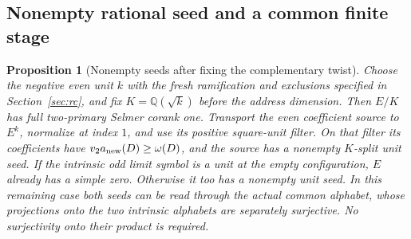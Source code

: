 \documentclass[11pt]{article}
\newtheorem{proposition}[theorem]{Proposition}
\theoremstyle{definition}
\theoremstyle{remark}
\newcommand{\Q}{\mathbb Q}
\begin{document}
\subsection{Nonempty rational seed and a common finite stage}
\begin{proposition}[Nonempty seeds after fixing the complementary twist]\label{ex:app-nonempty-seeds}
Choose the negative even unit $k$ with the fresh ramification and
exclusions specified in Section~\ref{sec:rc}, and fix
$K=\Q(\sqrt{k})$ before the address dimension. Then $E/K$ has full
two-primary Selmer corank one. Transport the even coefficient source
to $E^k$, normalize at index $1$, and use its positive square-unit
filter. On that filter its coefficients have
$v_2a_{\rm new}(D)\ge\omega(D)$, and the source has a nonempty
$K$-split unit seed.
If the intrinsic odd limit symbol is a unit at the empty
configuration, $E$ already has a simple zero. Otherwise it too has
a nonempty unit seed. In this remaining case both seeds can be
read through the actual common alphabet, whose projections onto
the two intrinsic alphabets are separately surjective. No
surjectivity onto their product is required.
\end{proposition}
\end{document}
